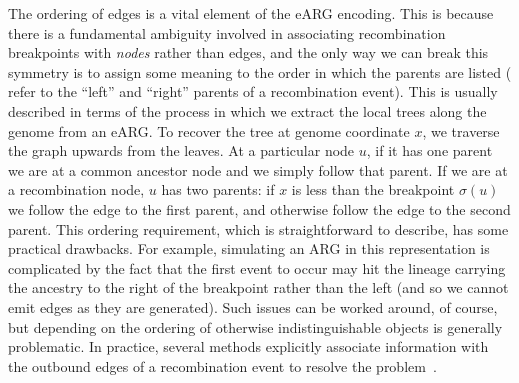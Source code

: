 \documentclass{article}
\begin{document}

The ordering of edges is a vital element of the eARG encoding.
This is because there is a fundamental ambiguity involved
in associating recombination breakpoints with \emph{nodes}
rather than edges,
and the only way we can break this symmetry is to assign
some meaning to the order in which the parents are listed
(\cite{griffiths1997ancestral} refer to the ``left'' and ``right''
parents of a recombination event). This is usually described
in terms of the process in which we extract the local trees
along the genome from an eARG.
To recover
the tree at genome coordinate $x$,
we traverse the graph upwards from the leaves. At a particular
node $u$, if it has one parent we are at a common ancestor
node and we simply follow that parent. If we are at a
recombination node, $u$ has two parents: if
$x$ is less than the breakpoint $\sigma(u)$ we follow
the edge to the first parent, and otherwise follow the edge
to the second parent.
This ordering requirement, which is straightforward
to describe, has some practical drawbacks. For example,
simulating an ARG in this representation is
complicated by the fact that the
first event to occur may hit the lineage carrying the ancestry
to the right of the breakpoint rather
than the left (and so we cannot emit edges as they are generated).
Such issues can be worked around, of course,
but depending on the ordering of otherwise indistinguishable
objects is generally problematic. In practice, several
methods
explicitly associate information with the outbound edges
of a recombination event
to resolve the problem~\citep{lyngso2005minimum,ignatieva2021kwarg}.
\end{document}
